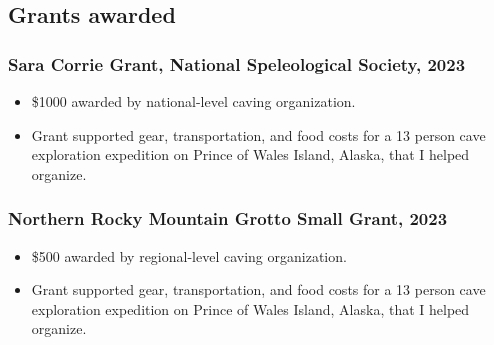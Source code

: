 \documentclass{article}
\begin{document}
	\subsection*{Grants awarded}
		\subsubsection*{Sara Corrie Grant, National Speleological Society, 2023}
			\begin{itemize}
				\item \$1000 awarded by national-level caving organization.
				\item Grant supported gear, transportation, and food costs for a 13 person cave exploration expedition on Prince of Wales Island, Alaska, that I helped organize.
			\end{itemize}
		\subsubsection*{Northern Rocky Mountain Grotto Small Grant, 2023}
			\begin{itemize}
				\item \$500 awarded by regional-level caving organization.
				\item Grant supported gear, transportation, and food costs for a 13 person cave exploration expedition on Prince of Wales Island, Alaska, that I helped organize.
			\end{itemize}

\end{document}
